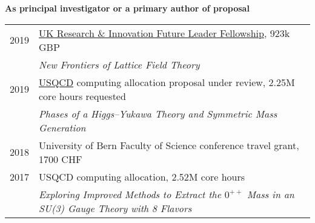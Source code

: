 \renewenvironment{spacelistout} {
  \begin{list} {} {
    \setlength{\topsep}{-8 pt}
    \setlength{\itemsep}{5 pt}
    \setlength{\leftmargin}{-1.15 in}
  }
}{
  \end{list}
}

\raggedright
\vspace{12 pt}
\begin{spacelistout}
  \item {\large \bfseries As principal investigator or a primary author of proposal} \\[10 pt]
    \begin{tabular}[t]{cl}
      2019 & \href{https://www.ukri.org/funding/funding-opportunities/future-leaders-fellowships/meet-our-future-leaders-fellows/david-schaich-university-of-liverpool/}{UK Research \& Innovation Future Leader Fellowship}, 923k GBP \\
           & \textit{New Frontiers of Lattice Field Theory}                                                                                                                                                                            \\[6 pt]
      2019 & \href{http://www.usqcd.org}{USQCD} computing allocation proposal under review, 2.25M core hours requested                                                                                                                 \\ %
           & \textit{Phases of a Higgs--Yukawa Theory and Symmetric Mass Generation}                                                                                                                                                   \\[6 pt]
      2018 & University of Bern Faculty of Science conference travel grant, 1700 CHF                                                                                                                                                   \\[6 pt]
      2017 & USQCD computing allocation, 2.52M core hours                                                                                                                                                                              \\ %
           & \textit{Exploring Improved Methods to Extract the $0^{++}$ Mass in an SU(3) Gauge Theory with 8 Flavors}                                                                                                                  \\[6 pt]

\end{tabular}
\end{spacelistout}
